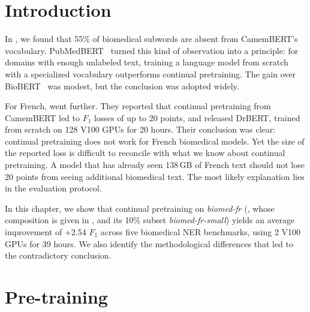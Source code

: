 %

\section{Introduction}

\begin{reviewread}
In , we found that 55\% of biomedical subwords are absent from CamemBERT's vocabulary. PubMedBERT~\citep{gu_domain-specific_2022} turned this kind of observation into a principle: for domains with enough unlabeled text, training a language model from scratch with a specialized vocabulary outperforms continual pretraining. The gain over BioBERT~\citep{lee_biobert_2019} was modest, but the conclusion was adopted widely.
\end{reviewread}

\begin{reviewread}
For French, \citet{labrak2023drbert} went further. They reported that continual pretraining from CamemBERT led to $F_1$ losses of up to 20 points, and released DrBERT, trained from scratch on 128 V100 GPUs for 20 hours. Their conclusion was clear: continual pretraining does not work for French biomedical models. Yet the size of the reported loss is difficult to reconcile with what we know about continual pretraining. A model that has already seen 138\,GB of French text should not lose 20 points from seeing additional biomedical text. The most likely explanation lies in the evaluation protocol.
\end{reviewread}

\begin{reviewread}
In this chapter, we show that continual pretraining on \textit{biomed-fr} (, whose composition is given in , and its 10\% subset \textit{biomed-fr-small}) yields an average improvement of +2.54 $F_1$ across five biomedical NER benchmarks, using 2 V100 GPUs for 39 hours. We also identify the methodological differences that led to the contradictory conclusion.
\end{reviewread}


\section{Pre-training}

